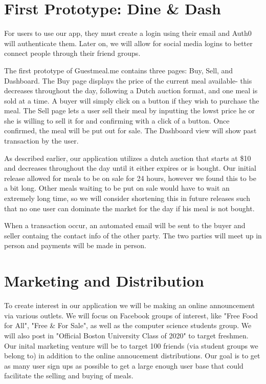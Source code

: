 \documentclass[column,12pt]{article}
\begin{document}
\section{First Prototype: Dine \& Dash}
For users to use our app, they must create a login using their email and Auth0 will authenticate them. Later on, we will allow for social media logins to better connect people through their friend groups. 

The first prototype of Guestmeal.me contains three pages: Buy, Sell, and Dashboard. The Buy page displays the price of the current meal available- this decreases throughout the day, following a Dutch auction format, and one meal is sold at a time. A buyer will simply click on a button if they wish to purchase the meal. The Sell page lets a user sell their meal by inputting the lowst price he or she is willing to sell it for and confirming with a click of a button. Once confirmed, the meal will be put out for sale. The Dashboard view will show past transaction by the user.

As described earlier, our application utilizes a dutch auction that starts at \$10 and decreases throughout the day until it either expires or is bought. Our initial release allowed for meals to be on sale for 24 hours, however we found this to be a bit long. Other meals waiting to be put on sale would have to wait an extremely long time, so we will consider shortening this in future releases such that no one user can dominate the market for the day if his meal is not bought. 

When a transaction occur, an automated email will be sent to the buyer and seller containg the contact info of the other party. The two parties will meet up in person and payments will be made in person. 

\section{Marketing and Distribution}
To create interest in our application we will be making an online announcement via various outlets. We will focus on Facebook groups of interest, like "Free Food for All", "Free \& For Sale", as well as the computer science students group. We will also post in "Official Boston University Class of 2020" to target freshmen. Our inital marketing venture will be to target 100 friends (via student groups we belong to) in addition to the online annoucement distributions. Our goal is to get as many user sign ups as possible to get a large enough user base that could facilitate the selling and buying of meals. 
\end{document}
